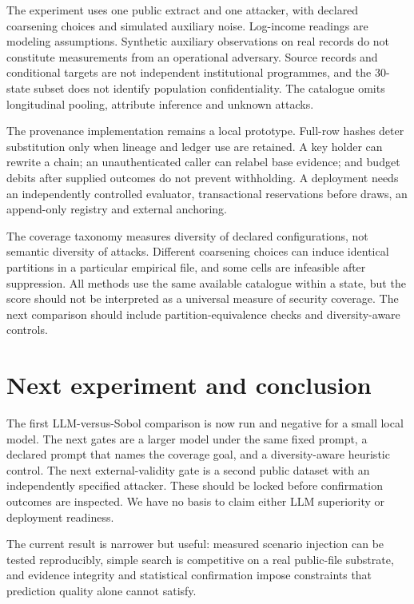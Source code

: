 \documentclass[11pt]{article}
\begin{document}
The experiment uses one public extract and one attacker, with declared coarsening choices and simulated auxiliary noise. Log-income readings are modeling assumptions. Synthetic auxiliary observations on real records do not constitute measurements from an operational adversary. Source records and conditional targets are not independent institutional programmes, and the 30-state subset does not identify population confidentiality. The catalogue omits longitudinal pooling, attribute inference and unknown attacks.

The provenance implementation remains a local prototype. Full-row hashes deter substitution only when lineage and ledger use are retained. A key holder can rewrite a chain; an unauthenticated caller can relabel base evidence; and budget debits after supplied outcomes do not prevent withholding. A deployment needs an independently controlled evaluator, transactional reservations before draws, an append-only registry and external anchoring.

The coverage taxonomy measures diversity of declared configurations, not semantic diversity of attacks. Different coarsening choices can induce identical partitions in a particular empirical file, and some cells are infeasible after suppression. All methods use the same available catalogue within a state, but the score should not be interpreted as a universal measure of security coverage. The next comparison should include partition-equivalence checks and diversity-aware controls.

\section{Next experiment and conclusion}
The first LLM-versus-Sobol comparison is now run and negative for a small local model. The next gates are a larger model under the same fixed prompt, a declared prompt that names the coverage goal, and a diversity-aware heuristic control. The next external-validity gate is a second public dataset with an independently specified attacker. These should be locked before confirmation outcomes are inspected. We have no basis to claim either LLM superiority or deployment readiness.

The current result is narrower but useful: measured scenario injection can be tested reproducibly, simple search is competitive on a real public-file substrate, and evidence integrity and statistical confirmation impose constraints that prediction quality alone cannot satisfy.
\end{document}
